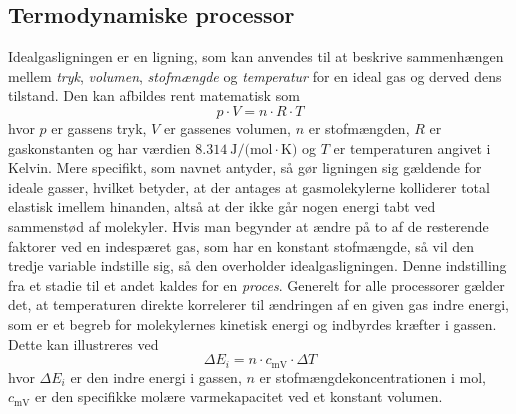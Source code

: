 \documentclass[SRC.tex]{subfiles}
\begin{document}
	\subsection{Termodynamiske processor}
	Idealgasligningen er en ligning, som kan anvendes til at beskrive sammenhængen mellem
	\textit{tryk}, \textit{volumen}, \textit{stofmængde} og \textit{temperatur} for en ideal 
	gas og derved dens tilstand. Den kan afbildes rent matematisk som
	\begin{equation}
	p \cdot V = n \cdot R \cdot T
	\label{eq:idealgasligningen}
	\end{equation}
	hvor \(p\) er gassens tryk, \(V\) er gassenes volumen, \(n\) er stofmængden, \(R\) er gaskonstanten
	og har værdien \(\SI{8.314}{\joule\per (\mole\cdot\kelvin)} \) og \(T\) er temperaturen angivet i 
	Kelvin. Mere specifikt, som navnet antyder, så gør ligningen sig 
	gældende for ideale gasser, hvilket betyder, at der antages at gasmolekylerne kolliderer 
	total elastisk imellem hinanden, altså at der ikke går nogen energi tabt ved sammenstød af 
	molekyler. Hvis man begynder at ændre på to af de resterende faktorer ved en indespæret gas, 
	som har en konstant stofmængde, så vil den tredje variable indstille sig, så den overholder
	idealgasligningen. Denne indstilling fra et stadie til et andet kaldes for en \textit{proces}. 
	Generelt for alle processorer gælder det, at temperaturen direkte korrelerer til ændringen af 
	en given gas indre energi, som er et begreb for molekylernes kinetisk energi og indbyrdes 
	kræfter i gassen. Dette kan illustreres ved
	\begin{equation}
	\Delta E_i = n \cdot c_{\text{mV}} \cdot \Delta T
	\label{eq:2}
	\end{equation}
	hvor \(\Delta E_i\) er den indre energi i gassen, \(n\) er stofmængdekoncentrationen i mol, 
	\(c_{\text{mV}}\) er den specifikke molære varmekapacitet ved et konstant volumen. 
	
\end{document}
